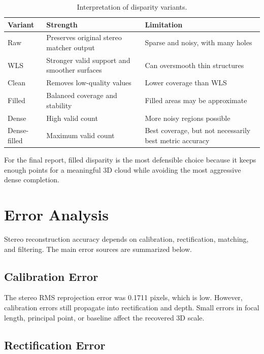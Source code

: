 \documentclass[11pt,a4paper]{article}
\begin{document}
\begin{table}[H]
\centering
\caption{Interpretation of disparity variants.}
\label{tab:disp_interpretation}
\begin{tabular}{p{}p{}p{}}
\toprule
\textbf{Variant} & \textbf{Strength} & \textbf{Limitation} \\
\midrule
Raw & Preserves original stereo matcher output & Sparse and noisy, with many holes \\
WLS & Stronger valid support and smoother surfaces & Can oversmooth thin structures \\
Clean & Removes low-quality values & Lower coverage than WLS \\
Filled & Balanced coverage and stability & Filled areas may be approximate \\
Dense & High valid count & More noisy regions possible \\
Dense-filled & Maximum valid count & Best coverage, but not necessarily best metric accuracy \\
\bottomrule
\end{tabular}
\end{table}

For the final report, filled disparity is the most defensible choice because it keeps enough points for a meaningful 3D cloud while avoiding the most aggressive dense completion.

\section{Error Analysis}

Stereo reconstruction accuracy depends on calibration, rectification, matching, and filtering. The main error sources are summarized below.

\subsection{Calibration Error}

The stereo RMS reprojection error was 0.1711 pixels, which is low. However, calibration errors still propagate into rectification and depth. Small errors in focal length, principal point, or baseline affect the recovered 3D scale.

\subsection{Rectification Error}
\end{document}
